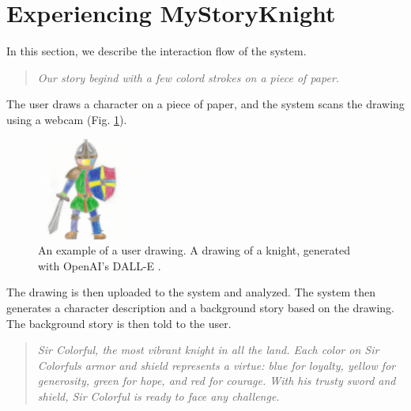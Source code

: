 \documentclass[submit,techrep,english]{ipsj}
\begin{document}
\section{Experiencing MyStoryKnight}
\label{subsec:using-mystoryknight}
In this section, we describe the interaction flow of the system.

\vspace{10pt} %

\begin{quote}
    \textit{Our story begind with a few colord strokes on a piece of paper.}
\end{quote}

\vspace{10pt} %

The user draws a character on a piece of paper, and the system scans the drawing using a webcam (Fig. \ref{fig:knight}).

\begin{figure}[h]
    \centering
    \includegraphics[width=0.3\textwidth]{figures/knight.png}
    \caption{An example of a user drawing. A drawing of a knight, generated with OpenAI's DALL-E \cite{21:dalle}.}
    \label{fig:knight}
\end{figure}

The drawing is then uploaded to the system and analyzed. The system then generates a character description and a background story based on the drawing. The background story is then told to the user.

\vspace{10pt} %

\begin{quote}
    \textit{Sir Colorful, the most vibrant knight in all the land. Each color on Sir Colorfuls armor and shield represents a virtue: blue for loyalty, yellow for generosity, green for hope, and red for courage. With his trusty sword and shield, Sir Colorful is ready to face any challenge.}
\end{quote}

\vspace{10pt} %
\end{document}

